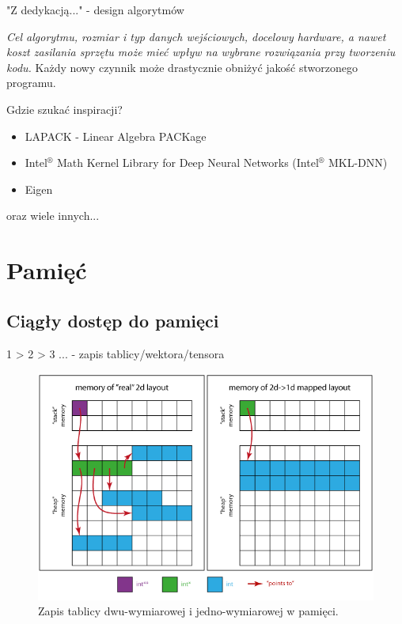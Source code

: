 \documentclass{if-beamer}
\begin{document}
\begin{frame}{"Z dedykacją..." - design algorytmów}

\emph{Cel algorytmu, rozmiar i typ danych wejściowych, docelowy hardware, a nawet koszt zasilania sprzętu może mieć wpływ na wybrane rozwiązania przy tworzeniu kodu.} Każdy nowy czynnik może drastycznie obniżyć jakość stworzonego programu.

\begin{block}{Gdzie szukać inspiracji?}
\begin{itemize}
  \item LAPACK - Linear Algebra PACKage
  \item Intel$^{®}$ Math Kernel Library for Deep Neural Networks (Intel$ ^{®}$ MKL-DNN)
  \item Eigen
\end{itemize}
  oraz wiele innych...
\end{block}

\end{frame}

\section{Pamięć}

\subsection{Ciągły dostęp do pamięci}

\begin{frame}{1 > 2 > 3 ... - zapis tablicy/wektora/tensora}

\begin{figure}
\centering
\includegraphics[scale=0.35]{1d2d.png}
\caption{Zapis tablicy dwu-wymiarowej i jedno-wymiarowej w pamięci.}
\end{figure}
  
\end{frame} 
\end{document}
